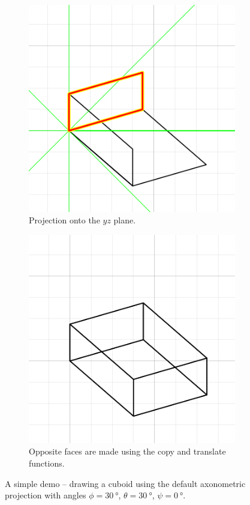 \documentclass[11pt,a4paper]{article}
\begin{document}
\begin{figure}
\begin{subfigure}[t]{0.4\textwidth}
\centering
\includegraphics[scale=0.6]{png/demo_step7.png} 
\caption{Projection onto the $yz$ plane.}
\label{fig:demo1_g}
\end{subfigure}
\begin{subfigure}[t]{0.4\textwidth}
\centering
\includegraphics[scale=0.6]{png/demo_step8.png} 
\caption{Opposite faces are made using the copy and translate functions.}
\label{fig:demo1_h}
\end{subfigure}

\caption{A simple demo -- drawing a cuboid using the default axonometric projection with angles $ \phi=\SI{30}{\degree} $, $ \theta=\SI{30}{\degree} $, $ \psi=\SI{0}{\degree} $.}
\end{figure}
\end{document}
